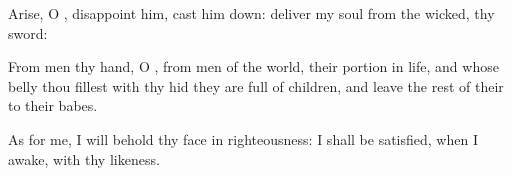 {\par }{\Q {}Arise, O
{},
disappoint
him, cast him
down:
deliver my
soul from the
wicked,
{} thy
sword:
\par }{\Q {}From
men
{} thy
hand, O
{}, from
men of the
world,
{} their
portion in
{}
life, and whose
belly thou
fillest with thy
hid
{} they are
full of
children, and
leave the
rest of their
{} to their
babes.
\par }{\Q {}As for me, I will
behold thy
face in
righteousness: I shall be
satisfied, when I
awake, with thy
likeness.

}
